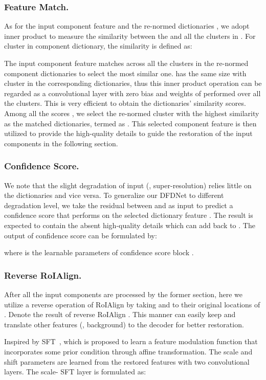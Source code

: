 \documentclass[runningheads]{llncs}
\begin{document}
\subsubsection{Feature Match.} As for the input component feature  and the re-normed dictionaries , we adopt inner product to measure the similarity between the  and all the clusters in . For  cluster in component dictionary, the similarity is defined as:

The input component feature  matches across all the clusters in the re-normed component dictionaries to select the most similar one.  has the same size with  cluster in the corresponding dictionaries, thus this inner product operation can be regarded as a convolutional layer with zero bias and weights of  performed over all the clusters. 
This is very efficient to obtain the dictionaries' similarity scores. Among all the scores , we select the re-normed cluster with the highest similarity as the matched dictionaries, termed as . This selected component feature  is then utilized to provide the high-quality details to guide the restoration of the input components in the following section.

\subsubsection{Confidence Score.} We note that the slight degradation of input (\eg,  super-resolution) relies little on the dictionaries and vice versa. To generalize our DFDNet to different degradation level, we take the residual between  and  as input to predict a confidence score that performs on the selected dictionary feature . The result is expected to contain the absent high-quality details which can add back to . The output of confidence score can be formulated by:

where  is the learnable parameters of confidence score block . 

\subsubsection{Reverse RoIAlign.} After all the input components are processed by the former section, here we utilize a reverse operation of RoIAlign by taking  and  to their original locations of . Denote the result of reverse RoIAlign . This manner can easily keep and translate other features (\eg, background)  to the decoder for better restoration.

Inspired by SFT~\cite{wang2018recovering}, which is proposed to learn a feature modulation function that incorporates some prior condition through affine transformation. The scale  and shift  parameters are learned from the restored features  with two convolutional layers. The scale- SFT layer is formulated as:
\end{document}
